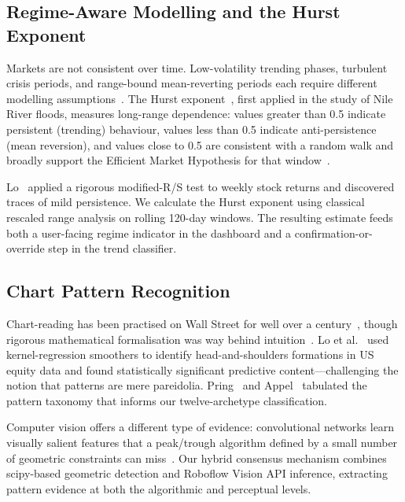 \documentclass[10pt,a4paper,twoside]{article}
\begin{document}
\subsection{Regime-Aware Modelling and the Hurst Exponent}

Markets are not consistent over time. Low-volatility trending phases,
turbulent crisis periods, and range-bound mean-reverting periods each
require different modelling assumptions~\cite{hamilton1989}. The Hurst
exponent~\cite{hurst1951}, first applied in the study of Nile River floods,
measures long-range dependence: values greater than 0.5 indicate persistent
(trending) behaviour, values less than 0.5 indicate anti-persistence (mean
reversion), and values close to 0.5 are consistent with a random walk and broadly
support the Efficient Market Hypothesis for that window~\cite{lo1991}.

Lo~\cite{lo1991} applied a rigorous modified-R/S test to weekly stock returns
and discovered traces of mild persistence. We calculate the Hurst exponent using
classical rescaled range analysis on rolling 120-day windows. The resulting
estimate feeds both a user-facing regime indicator in the dashboard and a
confirmation-or-override step in the trend classifier.

\subsection{Chart Pattern Recognition}

Chart-reading has been practised on Wall Street for well over a
century~\cite{murphy1999, edwards1948}, though rigorous mathematical
formalisation was way behind intuition~\cite{lo2000}. Lo et
al.~\cite{lo2000} used kernel-regression smoothers to identify
head-and-shoulders formations in US equity data and found statistically significant
predictive content---challenging the notion that patterns are mere
pareidolia. Pring~\cite{pring2002} and Appel~\cite{appel2005} tabulated
the pattern taxonomy that informs our twelve-archetype classification.

Computer vision offers a different type of evidence: convolutional networks
learn visually salient features that a peak/trough algorithm defined by a
small number of geometric constraints can miss~\cite{sezer2018}. Our hybrid consensus
mechanism combines scipy-based geometric detection and Roboflow Vision API
inference, extracting pattern evidence at both the algorithmic and
perceptual levels.

\end{document}
